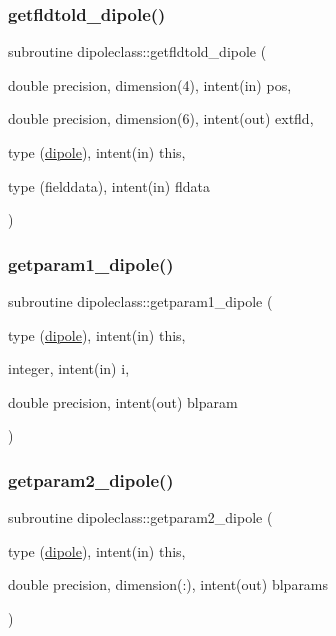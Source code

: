 \subsubsection{\texorpdfstring{getfldtold\_dipole()}{getfldtold\_dipole()}}
{\footnotesize\ttfamily subroutine dipoleclass\+::getfldtold\+\_\+dipole (\begin{DoxyParamCaption}\item[{double precision, dimension(4), intent(in)}]{pos,  }\item[{double precision, dimension(6), intent(out)}]{extfld,  }\item[{type (\mbox{\hyperlink{namespacedipoleclass_structdipoleclass_1_1dipole}{dipole}}), intent(in)}]{this,  }\item[{type (fielddata), intent(in)}]{fldata }\end{DoxyParamCaption})}

\mbox{\label{namespacedipoleclass_af02462235721b966a71753610096e85a}} 
\subsubsection{\texorpdfstring{getparam1\_dipole()}{getparam1\_dipole()}}
{\footnotesize\ttfamily subroutine dipoleclass\+::getparam1\+\_\+dipole (\begin{DoxyParamCaption}\item[{type (\mbox{\hyperlink{namespacedipoleclass_structdipoleclass_1_1dipole}{dipole}}), intent(in)}]{this,  }\item[{integer, intent(in)}]{i,  }\item[{double precision, intent(out)}]{blparam }\end{DoxyParamCaption})}

\mbox{\label{namespacedipoleclass_af793a317f0b5d337d6818755609641a7}} 
\subsubsection{\texorpdfstring{getparam2\_dipole()}{getparam2\_dipole()}}
{\footnotesize\ttfamily subroutine dipoleclass\+::getparam2\+\_\+dipole (\begin{DoxyParamCaption}\item[{type (\mbox{\hyperlink{namespacedipoleclass_structdipoleclass_1_1dipole}{dipole}}), intent(in)}]{this,  }\item[{double precision, dimension(\+:), intent(out)}]{blparams }\end{DoxyParamCaption})}

